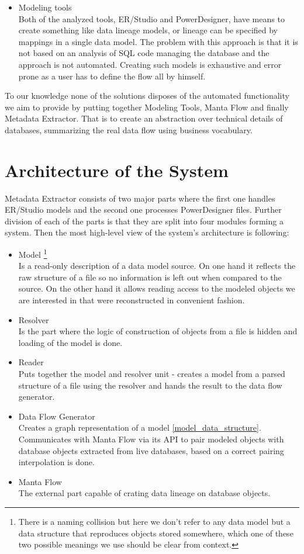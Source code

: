 \begin{itemize}
	\item Modeling tools \\
	Both of the analyzed tools, ER/Studio and PowerDesigner, have means to create something like data lineage models, or lineage can be specified by mappings in a single data model. The problem with this approach is that it is not based on an analysis of SQL code managing the database and the approach is not automated. Creating such models is exhaustive and error prone as a user has to define the flow all by himself. 
\end{itemize}


To our knowledge none of the solutions disposes of the automated functionality we aim to provide by putting together Modeling Tools, Manta Flow and finally Metadata Extractor. That is to create an abstraction over technical details of databases, summarizing the real data flow using business vocabulary.

\section{Architecture of the System}

Metadata Extractor consists of two major parts where the first one handles ER/Studio models and the second one processes PowerDesigner files.
Further division of each of the parts is that they are split into four modules forming a system. 
Then the most high-level view of the system's architecture is following:
\begin{itemize}
	\item Model \footnote{There is a naming collision but here we don't refer to any data model but a data structure that reproduces objects stored somewhere, which one of these two possible meanings we use should be clear from context.}\\ 
	Is a read-only description of a data model source. On one hand it reflects the raw structure of a file so no information is left out when compared to the source. 
	On the other hand it allows reading access to the modeled objects we are interested in that were reconstructed in convenient fashion. 
	\item Resolver \\ 
	Is the part where the logic of construction of objects from a file is hidden and loading of the model is done. 
	\item Reader \\
	Puts together the model and resolver unit - creates a model from a parsed structure of a file using the resolver and hands the result to the data flow generator.
	\item Data Flow Generator \\ 
	Creates a graph representation of a model \ref{model_data_structure}. Communicates with Manta Flow via its API to pair modeled objects with database objects extracted from live databases, based on a correct pairing interpolation is done.
	\item Manta Flow \\
	The external part capable of crating data lineage on database objects.
\end{itemize}
